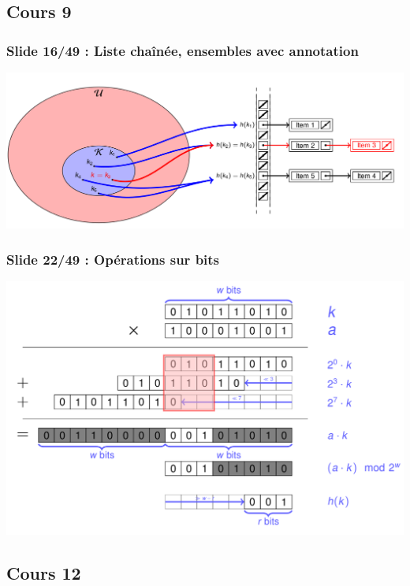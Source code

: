 \documentclass[12pt, a4paper]{article}
\begin{document}
\subsection{Cours 9}
\subsubsection{Slide 16/49 : Liste chaînée, ensembles avec annotation}
\begin{center}
\includegraphics[scale=0.3]{images/INFO-H304_C10_1}
\end{center}
\subsubsection{Slide 22/49 : Opérations sur bits}
\begin{center}
\includegraphics[scale=0.3]{images/INFO-H304_C10_2}
\end{center}
\subsection{Cours 12}
\end{document}
